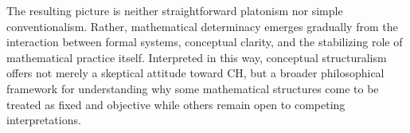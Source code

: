 \documentclass[11pt,a4paper]{article}
\theoremstyle{plain}
\begin{document}
The resulting picture is neither straightforward platonism nor simple conventionalism. Rather, mathematical determinacy emerges gradually from the interaction between formal systems, conceptual clarity, and the stabilizing role of mathematical practice itself. Interpreted in this way, conceptual structuralism offers not merely a skeptical attitude toward CH, but a broader philosophical framework for understanding why some mathematical structures come to be treated as fixed and objective while others remain open to competing interpretations.

\printbibliography
\end{document}
